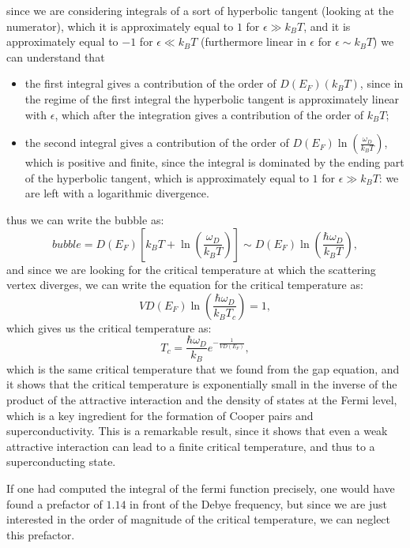 since we are considering integrals of a sort of hyperbolic tangent (looking at the numerator), which it is approximately equal to \(1\) for \(\epsilon \gg k_B T\), and it is approximately equal to \(-1\) for \(\epsilon \ll k_B T\) (furthermore linear in \(\epsilon\) for \(\epsilon \sim k_B T\)) we can understand that
\begin{itemize}
    \item the first integral gives a contribution of the order of \(D(E_F)(k_B T)\), since in the regime of the first integral the hyperbolic tangent is approximately linear with \(\epsilon\), which after the integration gives a contribution of the order of \(k_B T\);
    \item the second integral gives a contribution of the order of \(D(E_F) \ln(\frac{\omega_D}{k_B T})\), which is positive and finite, since the integral is dominated by the ending part of the hyperbolic tangent, which is approximately equal to \(1\) for \(\epsilon \gg k_B T\): we are left with a logarithmic divergence.
\end{itemize}
thus we can write the bubble as:
\[
    bubble = D(E_F) \left[ k_B T + \ln \left( \frac{\omega_D}{k_B T} \right) \right] \sim D(E_F) \ln \left( \frac{\hbar \omega_D}{k_B T} \right),
\]
and since we are looking for the critical temperature at which the scattering vertex diverges, we can write the equation for the critical temperature as:
\[
    V D(E_F) \ln \left( \frac{\hbar \omega_D}{k_B T_c} \right) = 1,
\]
which gives us the critical temperature as:
\[
    T_c = \frac{\hbar \omega_D}{k_B} e^{-\frac{1}{V D(E_F)}},
\]
which is the same critical temperature that we found from the gap equation, and it shows that the critical temperature is exponentially small in the inverse of the product of the attractive interaction and the density of states at the Fermi level, which is a key ingredient for the formation of Cooper pairs and superconductivity. This is a remarkable result, since it shows that even a weak attractive interaction can lead to a finite critical temperature, and thus to a superconducting state.

If one had computed the integral of the fermi function precisely, one would have found a prefactor of \(1.14\) in front of the Debye frequency, but since we are just interested in the order of magnitude of the critical temperature, we can neglect this prefactor.